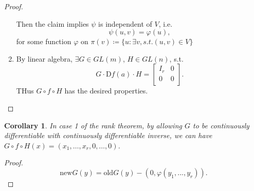 \documentclass[12pt]{article}
\theoremstyle{plain}
\newtheorem*{corollary}{Corollary}
\theoremstyle{definition}
\begin{document}
\begin{proof}
\begin{enumerate}
            Then the claim implies $\psi$ is independent of $V$, i.e.
            \[
                \psi(u,v) = \varphi(u),
            \]
            for some function $\varphi$ on $\pi(v)\coloneqq\{u:\exists v, s.t. (u,v)\in V\}$
        \item By linear algebra, $\exists G\in GL(m)$, $H\in GL(n)$, s.t.\ 
            \[
                G\cdot \mathrm{D}f(a)\cdot H = \begin{bmatrix}
                    I_r&0\\
                    0&0\\
               \end{bmatrix}.
           \]
           THus $G\circ f\circ H$ has the desired properties.
    \end{enumerate}
\end{proof}

\begin{corollary}
    In case 1 of the rank theorem, by allowing $G$ to be continuously differentiable with continuously differentiable inverse, we can have
    $G\circ f\circ H(x) = (x_1,\ldots,x_r,0,\ldots,0)$.
\end{corollary}
\begin{proof}
    \[
        \text{new} G(y) = \text{old}G(y) - (0,\varphi(y_1,...,y_r)).
    \]
\end{proof}
\end{document}
